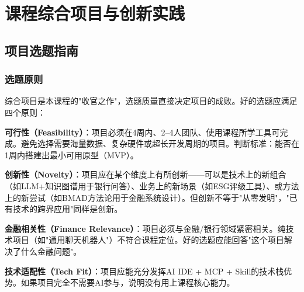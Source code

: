 
\chapter{课程综合项目与创新实践}


\section{项目选题指南}

\subsection{选题原则}

综合项目是本课程的"收官之作"，选题质量直接决定项目的成败。好的选题应满足四个原则：

\textbf{可行性（Feasibility）}：项目必须在4周内、2--4人团队、使用课程所学工具可完成。避免选择需要海量数据、复杂硬件或超长开发周期的项目。判断标准：能否在1周内搭建出最小可用原型（MVP）。

\textbf{创新性（Novelty）}：项目应在某个维度上有所创新——可以是技术上的新组合（如LLM+知识图谱用于银行问答）、业务上的新场景（如ESG评级工具）、或方法上的新尝试（如BMAD方法论用于金融系统设计）。但创新不等于"从零发明"，"已有技术的跨界应用"同样是创新。

\textbf{金融相关性（Finance Relevance）}：项目必须与金融/银行领域紧密相关。纯技术项目（如"通用聊天机器人"）不符合课程定位。好的选题应能回答"这个项目解决了什么金融问题"。

\textbf{技术适配性（Tech Fit）}：项目应能充分发挥AI IDE + MCP + Skill的技术栈优势。如果项目完全不需要AI参与，说明没有用上课程核心能力。

